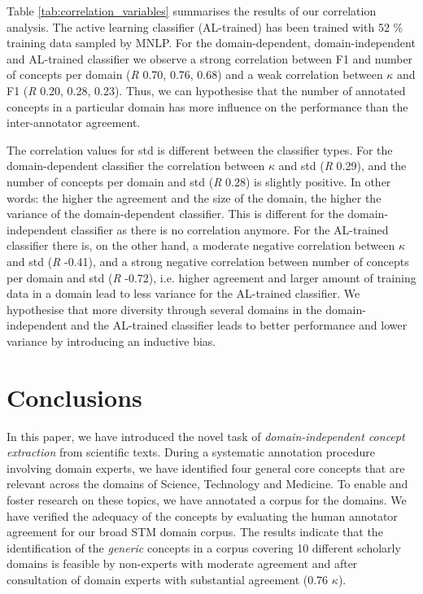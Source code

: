 \documentclass[runningheads]{llncs}
\begin{document}
Table \ref{tab:correlation_variables} summarises the results of our correlation analysis. The active learning classifier (AL-trained) has been trained with 52 \% training data sampled by MNLP.
For the domain-dependent, domain-independent and AL-trained classifier we observe a strong correlation between F1 and number of concepts per domain (\textit{R} 0.70, 0.76, 0.68) and a weak correlation between $\kappa$ and F1 (\textit{R} 0.20, 0.28, 0.23). Thus, we can hypothesise that the number of annotated concepts in a particular domain has more influence on the performance than the inter-annotator agreement.

The correlation values for std is different between the classifier types.
For the domain-dependent classifier the correlation between $\kappa$ and std (\textit{R} 0.29), and the number of concepts per domain and std (\textit{R} 0.28) is slightly positive. In other words: the higher the agreement and the size of the domain, the higher the variance of the domain-dependent classifier. This is different for the domain-independent classifier as there is no correlation anymore. For the AL-trained classifier there is, on the other hand, a moderate negative correlation between $\kappa$ and std (\textit{R} -0.41), and a strong negative correlation between number of concepts per domain and std (\textit{R} -0.72), i.e. higher agreement and larger amount of training data in a domain lead to less variance for the AL-trained classifier.
We hypothesise that more diversity through several domains in the domain-independent and the AL-trained classifier leads to better performance and lower variance by introducing an inductive bias.



\section{Conclusions}
In this paper, we have introduced the novel task of \textit{domain-independent concept extraction} from scientific texts. During a systematic annotation procedure involving domain experts, we have identified four general core concepts that are relevant across the domains of Science, Technology and Medicine. To enable and foster research on these topics, we have annotated a corpus for the domains.
We have verified the adequacy of the concepts by evaluating the human annotator agreement for our broad STM domain corpus.
The results indicate that the identification of the \textit{generic} concepts in a corpus covering 10 different scholarly domains is feasible by non-experts with moderate agreement and after consultation of domain experts with substantial agreement (0.76 $\kappa$).
\end{document}
